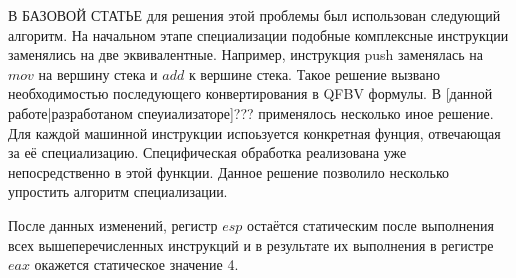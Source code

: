 \documentclass{spbau-diploma}
\begin{document}
В {\LARGE БАЗОВОЙ СТАТЬЕ} для решения этой проблемы был использован следующий алгоритм. На начальном этапе специализации подобные комплексные инструкции заменялись на две эквивалентные. Например, инструкция push заменялась на $mov$ на вершину стека и $add$ к вершине стека. Такое решение вызвано необходимостью последующего конвертирования в QFBV формулы. В [данной работе|разработаном спеуиализаторе]??? применялось несколько иное решение. Для каждой машинной инструкции испоьзуется конкретная фунция, отвечающая за её специализацию. Специфическая обработка реализована уже непосредственно в этой функции. Данное решение позволило несколько упростить алгоритм специализации.

После данных изменений, регистр $esp$ остаётся статическим после выполнения всех вышеперечисленных инструкций и в результате их выполнения в регистре $eax$ окажется статическое значение 4.
\end{document}
